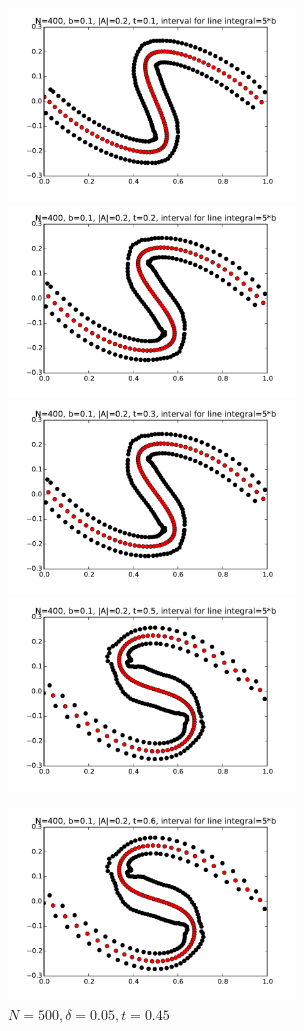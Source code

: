 \documentclass[12pt,twoside]{article}
\begin{document}
\begin{figure}[ht]
\centering
\begin{minipage}[b]{0.45\linewidth}
\includegraphics[width=3in,height=2in]{t01_B01.pdf}
\includegraphics[width=3in,height=2in]{t02_B01.pdf}
\includegraphics[width=3in,height=2in]{t03_B01.pdf}
\includegraphics[width=3in,height=2in]{t05_B01.pdf}
\caption{$N=500 , \delta=0.05 ,  t=0.45$ }
\end{minipage}
\quad
\begin{minipage}[b]{0.45\linewidth}
\includegraphics[width=3in,height=2in]{t06_B01.pdf}

\end{minipage}
\end{figure}
\end{document}

